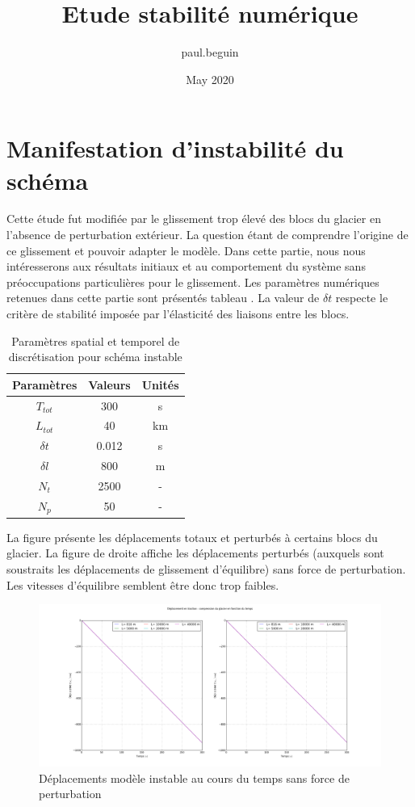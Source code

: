 \documentclass[11pt, a4paper]{article}
\title{Etude stabilité numérique}
\author{paul.beguin }
\date{May 2020}
\begin{document}
\maketitle
\section{Manifestation d'instabilité du schéma}
Cette étude fut modifiée par le glissement trop élevé des blocs du glacier en l'absence de perturbation extérieur. La question étant de comprendre l'origine de ce glissement et pouvoir adapter le modèle. Dans cette partie, nous nous intéresserons aux résultats initiaux et au comportement du système sans préoccupations particulières pour le glissement. Les paramètres numériques retenues dans cette partie sont présentés tableau . La valeur de $\delta t$ respecte le critère de stabilité imposée par l'élasticité des liaisons entre les blocs.
\begin{table}[h!]
    \centering
    \begin{tabular}{|ccc|}
         \hline
         \textbf{Paramètres} & \textbf{Valeurs} & \textbf{Unités} \\
         \hline
         $T_{tot}$ & 300 & s \\
         \hline
         $L_{tot}$ & 40 & km \\
         \hline
         $\delta t$ & 0.012 & s \\
         \hline
         $\delta l$ & 800 & m \\
         \hline
         $N_{t}$ & 2500 & - \\
         \hline
         $N_{p}$ & 50 & - \\
         \hline 
    \end{tabular}
    \caption{Paramètres spatial et temporel de discrétisation pour schéma instable}
    \label{PaSimuInsta}
\end{table}
\setlength{\parindent}{1cm} La figure  présente les déplacements totaux et perturbés à certains blocs du glacier. La figure de droite affiche les déplacements perturbés (auxquels sont soustraits les déplacements de glissement d'équilibre) sans force de perturbation. Les vitesses d'équilibre semblent être donc trop faibles.
\begin{figure}[h!]
    \centering
    \includegraphics[width=1\linewidth]{figures/Part1/DeplacementDt0012Init.png}
    \caption{Déplacements modèle instable au cours du temps sans force de perturbation}
    \label{UtInstable}
\end{figure}
\\
\end{document}
